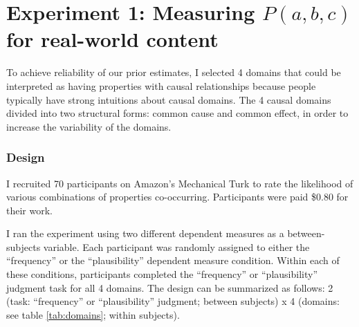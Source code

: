 \documentclass{llncs} %
\begin{document}
\section{Experiment 1: Measuring $P(a, b, c)$ for real-world content}
\label{prelicit}

To achieve reliability of our prior estimates, I selected 4 domains that could be interpreted as having properties with causal relationships because people typically have strong intuitions about causal domains. The 4 causal domains divided into two structural forms: common cause and common effect, in order to increase the variability of the domains. 

\subsubsection{Design}

I recruited 70 participants on Amazon's Mechanical Turk to rate the likelihood of various combinations of properties co-occurring. Participants were paid \$0.80 for their work.

I ran the experiment using two different dependent measures as a between-subjects variable. Each participant was randomly assigned to either the ``frequency'' or the ``plausibility'' dependent measure condition. Within each of these conditions, participants completed the ``frequency'' or ``plausibility'' judgment task for all 4 domains. The design can be summarized as follows: 2 (task: ``frequency'' or ``plausibility'' judgment; between subjects) x 4 (domains: see table \ref{tab:domains}; within subjects).
\end{document}
